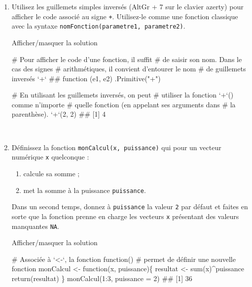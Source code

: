 \documentclass[12pt,]{article}
\newenvironment{Shaded}{}{}
\newcommand{\KeywordTok}[1]{\textcolor[rgb]{0.00,0.00,1.00}{{#1}}}
\newcommand{\DataTypeTok}[1]{{#1}}
\newcommand{\DecValTok}[1]{{#1}}
\newcommand{\StringTok}[1]{\textcolor[rgb]{0.00,0.50,0.50}{{#1}}}
\newcommand{\CommentTok}[1]{\textcolor[rgb]{0.00,0.50,0.00}{{#1}}}
\newcommand{\NormalTok}[1]{{#1}}
\begin{document}
\begin{enumerate}
\def\labelenumi{\alph{enumi}.}
\item
  Utilisez les guillemets simples inversés (AltGr + 7 sur le clavier
  azerty) pour afficher le code associé au signe \texttt{+}. Utilisez-le
  comme une fonction classique avec la syntaxe
  \texttt{nomFonction(parametre1,\ parametre2)}.

  Afficher/masquer la solution

  \hypertarget{sol15}{}
\begin{Shaded}
\begin{Highlighting}[]
\CommentTok{# Pour afficher le code d'une fonction, il suffit}
\CommentTok{# de saisir son nom. Dans le cas des signes }
\CommentTok{# arithmétiques, il convient d'entourer le nom}
\CommentTok{# de guillemets inversés}
\StringTok{`}\DataTypeTok{+}\StringTok{`}
\NormalTok{## function (e1, e2)  .Primitive("+")}

\CommentTok{# En utilisant les guillemets inversés, on peut}
\CommentTok{# utiliser la fonction `+`() comme n'importe}
\CommentTok{# quelle fonction (en appelant ses arguments dans}
\CommentTok{# la parenthèse).}
\StringTok{`}\DataTypeTok{+}\StringTok{`}\NormalTok{(}\DecValTok{2}\NormalTok{, }\DecValTok{2}\NormalTok{)}
\NormalTok{## [1] 4}
\end{Highlighting}
\end{Shaded}

  ~
\item
  Définissez la fonction \texttt{monCalcul(x,\ puissance)} qui pour un
  vecteur numérique \texttt{x} quelconque :

  \begin{enumerate}
  \def\labelenumii{\arabic{enumii}.}
  \item
    calcule sa somme ;
  \item
    met la somme à la puissance \texttt{puissance}.
  \end{enumerate}

  Dans un second temps, donnez à \texttt{puissance} la valeur \texttt{2}
  par défaut et faites en sorte que la fonction prenne en charge les
  vecteurs \texttt{x} présentant des valeurs manquantes \texttt{NA}.

  Afficher/masquer la solution

  \hypertarget{sol16}{}
\begin{Shaded}
\begin{Highlighting}[]
\CommentTok{# Associée à `<-`, la fonction function()}
\CommentTok{# permet de définir une nouvelle fonction}
\NormalTok{monCalcul <-}\StringTok{ }\NormalTok{function(x, puissance)\{}
  \NormalTok{resultat <-}\StringTok{ }\KeywordTok{sum}\NormalTok{(x)^puissance}
  \KeywordTok{return}\NormalTok{(resultat)}
\NormalTok{\}}
\KeywordTok{monCalcul}\NormalTok{(}\DecValTok{1}\NormalTok{:}\DecValTok{3}\NormalTok{, }\DataTypeTok{puissance =} \DecValTok{2}\NormalTok{)}
\NormalTok{## [1] 36}


\end{Highlighting}
\end{Shaded}
\end{enumerate}
\end{document}
